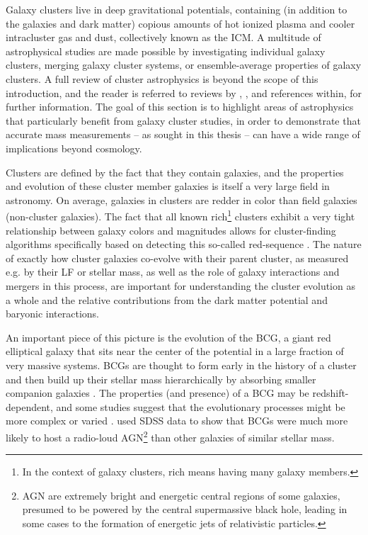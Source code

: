 Galaxy clusters live in deep gravitational potentials, containing (in addition to the galaxies and dark matter) copious amounts of hot ionized plasma and cooler intracluster gas and dust, collectively known as the \acf{ICM}. A multitude of astrophysical studies are made possible by investigating individual galaxy clusters, merging galaxy cluster systems, or ensemble-average properties of galaxy clusters. A full review of cluster astrophysics is beyond the scope of this introduction, and the reader is referred to reviews by \citet{Kravtsov12}, \citet{Voit05}, and references within, for further information. The goal of this section is to highlight areas of astrophysics that particularly benefit from galaxy cluster studies, in order to demonstrate that accurate mass measurements -- as sought in this thesis -- can have a wide range of implications beyond cosmology.

Clusters are defined by the fact that they contain galaxies, and the properties and evolution of these cluster member galaxies is itself a very large field in astronomy. On average, galaxies in clusters are redder in color than field galaxies (non-cluster galaxies). The fact that all known rich\footnote{In the context of galaxy clusters, rich means having many galaxy members.} clusters exhibit a very tight relationship between galaxy colors and magnitudes allows for cluster-finding algorithms specifically based on detecting this so-called red-sequence \citep{Gladders00,Rykoff14}. The nature of exactly how cluster galaxies co-evolve with their parent cluster, as measured e.g. by their \ac{LF} or stellar mass, as well as the role of galaxy interactions and mergers in this process, are important for understanding the cluster evolution as a whole and the relative contributions from the dark matter potential and baryonic interactions. 

An important piece of this picture is the evolution of the \ac{BCG}, a giant red elliptical galaxy that sits near the center of the potential in a large fraction of very massive systems. \ac{BCG}s are thought to form early in the history of a cluster and then build up their stellar mass hierarchically by absorbing smaller companion galaxies \citep{DeLucia07}. The properties (and presence) of a \ac{BCG} may be redshift-dependent, and some studies suggest that the evolutionary processes might be more complex or varied \citep{Oliva15}. \citet{Best07} used \ac{SDSS} data to show that \ac{BCG}s were much more likely to host a radio-loud \ac{AGN}\footnote{\ac{AGN} are extremely bright and energetic central regions of some galaxies, presumed to be powered by the central supermassive black hole, leading in some cases to the formation of energetic jets of relativistic particles.} than other galaxies of similar stellar mass.

